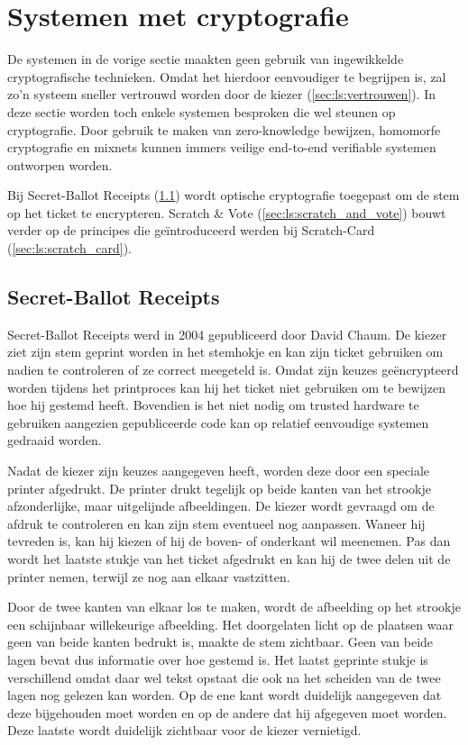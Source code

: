 \section{Systemen met cryptografie}

De systemen in de vorige sectie maakten geen gebruik van ingewikkelde cryptografische technieken. Omdat het hierdoor eenvoudiger te begrijpen is, zal zo'n systeem sneller vertrouwd worden door de kiezer (\ref{sec:ls:vertrouwen}). In deze sectie worden toch enkele systemen besproken die wel steunen op cryptografie. Door gebruik te maken van zero-knowledge bewijzen, homomorfe cryptografie en mixnets kunnen immers veilige end-to-end verifiable systemen ontworpen worden.

\npar Bij Secret-Ballot Receipts (\ref{sec:ls:secret_ballot_receipts}) wordt optische cryptografie toegepast om de stem op het ticket te encrypteren. Scratch \& Vote (\ref{sec:ls:scratch_and_vote}) bouwt verder op de principes die geïntroduceerd werden bij Scratch-Card (\ref{sec:ls:scratch_card}).

\subsection{Secret-Ballot Receipts}
\label{sec:ls:secret_ballot_receipts}

Secret-Ballot Receipts\cite{chaum_secret_ballot} werd in 2004 gepubliceerd door David Chaum. De kiezer ziet zijn stem geprint worden in het stemhokje en kan zijn ticket gebruiken om nadien te controleren of ze correct meegeteld is. Omdat zijn keuzes ge\"encrypteerd worden tijdens het printproces kan hij het ticket niet gebruiken om te bewijzen hoe hij gestemd heeft. Bovendien is het niet nodig om trusted hardware te gebruiken aangezien gepubliceerde code kan op relatief eenvoudige systemen gedraaid worden.

\npar Nadat de kiezer zijn keuzes aangegeven heeft, worden deze door een speciale printer afgedrukt. De printer drukt tegelijk op beide kanten van het strookje afzonderlijke, maar uitgelijnde afbeeldingen. De kiezer wordt gevraagd om de afdruk te controleren en kan zijn stem eventueel nog aanpassen. Waneer hij tevreden is, kan hij kiezen of hij de boven- of onderkant wil meenemen. Pas dan wordt het laatste stukje van het ticket afgedrukt en kan hij de twee delen uit de printer nemen, terwijl ze nog aan elkaar vastzitten.

\npar Door de twee kanten van elkaar los te maken, wordt de afbeelding op het strookje een schijnbaar willekeurige afbeelding. Het doorgelaten licht op de plaatsen waar geen van beide kanten bedrukt is, maakte de stem zichtbaar. Geen van beide lagen bevat dus informatie over hoe gestemd is. Het laatst geprinte stukje is verschillend omdat daar wel tekst opstaat die ook na het scheiden van de twee lagen nog gelezen kan worden. Op de ene kant wordt duidelijk aangegeven dat deze bijgehouden moet worden en op de andere dat hij afgegeven moet worden. Deze laatste wordt duidelijk zichtbaar voor de kiezer vernietigd.


